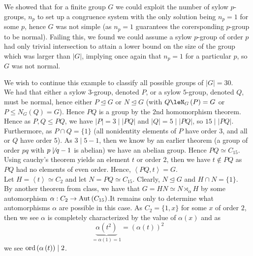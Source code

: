 \begin{recall}
	We showed that for a finite group \(G\) we could exploit the number of sylow \(p\)-groups, \(n_{p}\) to set up a congruence system with the only solution being \(n_{p} = 1\) for some \(p\), hence \(G\) was not simple (as \(n_{p} = 1\) guarantees the corersponding \(p\)-group to be normal). Failing this, we found we could assume a sylow \(p\)-group of order \(p\) had only trivial intersection to attain a lower bound on the size of the group which was larger than \(\left| G \right| \), implying once again that \(n_{p} =1\) for a particular \(p\), so \(G\) was not normal.
\end{recall}
We wish to continue this example to classify all possible groups of \(\left| G \right|  = 30\).\\
We had that either a sylow \(3\)-group, denoted \(P\), or a sylow \(5\)-group, denoted \(Q\),  must be normal, hence either \(P \trianglelefteq G\) or \(N\trianglelefteq G\) (with \(Q \leN_{G}\left( P \right)  = G\) or \(P \le N_{G}\left( Q \right) = G\)). Hence \( PQ\) is a group by the \(2\)nd homomorphism theorem.\\
Hence as \( P, Q \le PQ\), we have \(\left| P \right|  = 3 \mid \left| PQ \right| \) and \(\left| Q \right|  = 5 \mid \left| PQ \right| \), so \(15 \mid \left| PQ \right| \). Furthermore, as \(P \cap Q = \{1\} \) (all nonidentity elements of \(P\) have order \(3\), and all or \(Q\) have order \(5\)). As \(3 \mid 5 - 1\), then we know by an earlier theorem (a group of order \(pq\) with \(p \not\mid q-1\) is abelian) we have an abelian group. Hence \(PQ \simeq C_{15}\). Using cauchy's theorem yields an element \(t\) or order \(2\), then we have \(t \not\in PQ\) as \(PQ\) had no elements of even order. Hence, \(\left<PQ, t \right>  = G\).\\
Let \(H = \left<t \right> \simeq C_2\)  and let \(N = PQ \simeq C_{15}\). Clearly, \(N \trianglelefteq G\) and \(H \cap N = \{1\} \).\\
By another theorem from class, we have that \(G = HN \simeq N \rtimes_{\alpha} H\) by some automorphism \(\alpha : C_2 \to \operatorname{Aut} \left( C_{15} \right) \).It remains only to determine what automorphisms \(\alpha\) are possible in this case. As \(C_2 = \{1, x\} \) for some \(x\) of order \(2\), then we see \(\alpha\) is completely characterized by the value of \(\alpha \left( x \right) \) and as \[
	\underbrace{\alpha\left( t^2 \right) }_{= \alpha \left( 1 \right)  = 1}  = \left( \alpha \left( t \right)  \right) ^2
\]  we see \(\operatorname{ord} \left( \alpha \left( t \right)  \right)  \mid 2\).\\

